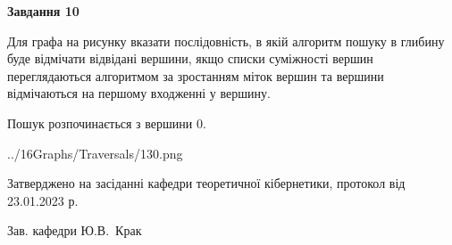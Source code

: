\documentclass[12pt, ukrainian]{article}
\begin{document}
{\begin {large}
{\begin {center}\textbf{Завдання 10}\end {center}}\par
Для графа на рисунку вказати послідовність, в якій алгоритм пошуку в глибину буде відмічати відвідані вершини, якщо списки суміжності вершин переглядаються алгоритмом за зростанням міток вершин та вершини відмічаються на першому вход\-женні у вершину.\par
Пошук розпочинається з вершини 0.\par

\begin{center}
	{../16Graphs/Traversals/130.png}
\end{center}\par
\newpage


\end {large}
}
{\smallskip \begin {small} Затверджено на засіданні кафедри теоретичної кібернетики, протокол  від   23.01.2023 р.\par\smallskip\smallskip
{\parbox {6.5 cm}{Зав. кафедри \dotfill Ю.В.~Крак}} \end{small}}
\end{document}
